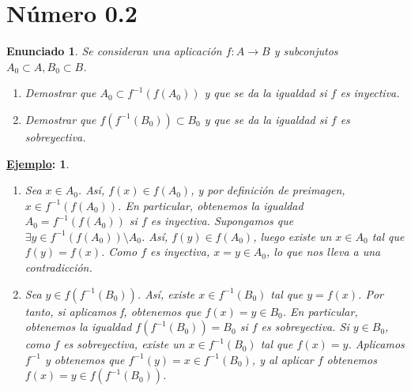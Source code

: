 \documentclass[10pt,a4paper,openright]{book}
\theoremstyle{break}
\newtheorem*{enun}{Enunciado}
\newtheorem*{ej}{\underline{Ejemplo}:}
\begin{document}
\section{Número 0.2}
\begin{enun}
Se consideran una aplicación $f: A \rightarrow B$ y subconjutos $A_0 \subset A, B_0 \subset B$.
\begin{enumerate}[label={(\arabic*)}]
 \item Demostrar que $A_0 \subset f^{-1}(f(A_0))$ y que se da la igualdad si $f$  es inyectiva.
 \item Demostrar que $f(f^{-1}(B_0)) \subset B_0$ y que se da la igualdad si $f$ es sobreyectiva.
\end{enumerate}
\end{enun}
\begin{ej}
\begin{enumerate}[label={(\arabic*)}]
 \item Sea $x \in A_0$. Así, $f(x) \in f(A_0)$, y por definición de preimagen, $x \in f^{-1}(f(A_0))$. En particular, obtenemos la igualdad $A_0 
 = f^{-1}(f(A_0))$ si $f$ es inyectiva. Supongamos que $\exists y \in f^{-1}(f(A_0)) \setminus A_0$. Así, $f(y) \in f(A_0)$, luego existe un $x \in A_0$ tal que $f(y) = f(x)$. Como $f$ es inyectiva, $x = y \in A_0$, lo que nos lleva a una contradicción. 
 \item Sea $y \in f(f^{-1}(B_0))$. Así, existe $x \in f^{-1}(B_0)$ tal que $y = f(x)$. Por tanto, si aplicamos f, obtenemos que $f(x) = y \in B_0$. En particular, obtenemos la igualdad $f(f^{-1}(B_0)) = B_0$ si $f$ es sobreyectiva. Si $y \in B_0$, como $f$ es sobreyectiva, existe un $x \in f^{-1} (B_0)$ tal que $f(x) = y$. Aplicamos $f^{-1}$ y obtenemos que $f^{-1}(y) = x \in f^{-1}(B_0)$, y al aplicar $f$ obtenemos $f(x) = y \in f(f^{-1}(B_0))$.
\end{enumerate}
\end{ej}
\end{document}
